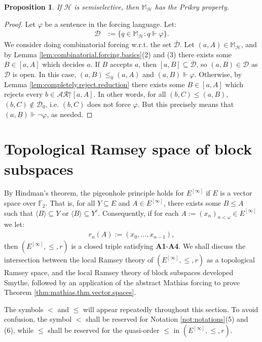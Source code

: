 \documentclass[11pt,reqno]{amsart}
\theoremstyle{plain}
\numberwithin{equation}{section}
\newtheorem{proposition}[theorem]{Proposition}
\theoremstyle{definition}
\renewcommand{\c}[1]{\langle #1 \rangle}
\renewcommand{\bar}[1]{\overline{#1}}
\newcommand{\cal}{\mathcal}
\newcommand{\forces}{\Vdash}
\newcommand{\restrictedto}{\mathord{\upharpoonright}}
\renewcommand{\H}{\cal{H}}
\newcommand{\D}{\cal{D}}
\begin{document}
\begin{proposition}
\label{prop:semiselective.implies.Prikry}
    If $\H$ is semiselective, then $\mathbb{M}_\H$ has the Prikry property.
\end{proposition}

\begin{proof}
    Let $\varphi$ be a sentence in the forcing language. Let:
    \begin{align*}
        \D &:= \{q \in \mathbb{M}_\H : q \forces \varphi\}.
    \end{align*}
    We consider doing combinatorial forcing w.r.t. the set $\bar{\D}$. Let $(a,A) \in \mathbb{M}_\H$, and by Lemma \ref{lem:combinatorial.forcing.basics}(2) and (3) there exists some $B \in [a,A]$ which decides $a$. If $B$ accepts $a$, then $[a,B] \subseteq \bar{\D}$, so $(a,B) \in \D$ as $\D$ is open. In this case, $(a,B) \leq_0 (a,A)$ and $(a,B) \forces \varphi$. Otherwise, by Lemma \ref{lem:completely.reject.reduction} there exists some $B \in [a,A]$ which rejects every $b \in \cal{AR}\restrictedto[a,A]$. In other words, for all $(b,C) \leq (a,B)$, $(b,C) \notin \D_0$, i.e. $(b,C)$ does not force $\varphi$. But this precisely means that $(a,B) \forces \neg\varphi$, as needed.
\end{proof}

\section{Topological Ramsey space of block subspaces}
\label{sec:TRS.block.subspaces}
By Hindman's theorem, the pigeonhole principle holds for $E^{[\infty]}$ if $E$ is a vector space over $\mathbb{F}_2$. That is, for all $Y \subseteq E$ and $A \in E^{[\infty]}$, there exists some $B \leq A$ such that $\c{B} \subseteq Y$ or $\c{B} \subseteq Y^c$. Consequently, if for each $A := (x_n)_{n<\omega} \in E^{[\infty]}$ we let:
\begin{align*}
    r_n(A) := (x_0,\dots,x_{n-1}),
\end{align*}
then $(E^{[\infty]},\leq,r)$ is a closed triple satisfying \textbf{A1}-\textbf{A4}. We shall discuss the intersection between the local Ramsey theory of $(E^{[\infty]},\leq,r)$ as a topological Ramsey space, and the local Ramsey theory of block subspaces developed Smythe, followed by an application of the abstract Mathias forcing to prove Theorem \ref{thm:mathias.thm.vector.spaces}.

The symbols $<$ and $\leq$ will appear repeatedly throughout this section. To avoid confusion, the symbol $<$ shall be reserved for Notation \ref{not:notations}(5) and (6), while $\leq$ shall be reserved for the quasi-order $\leq$ in $(E^{[\infty]},\leq,r)$. 
\end{document}
